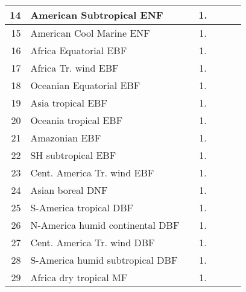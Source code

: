 {{\begin{tabular}{||r|l||c|c|c|c|c||}
 \hline
          14  & American Subtropical ENF                                     &       &  1.   &       &       \\
 \hline
          15  & American Cool Marine ENF                                     &       &  1.   &       &       \\
 \hline
 \hline
          16  & Africa Equatorial EBF                                        &       &  1.   &       &       \\
 \hline
          17  & Africa Tr. wind EBF                                          &       &  1.   &       &       \\
 \hline
          18  & Oceanian Equatorial EBF                                      &       &  1.   &       &       \\
 \hline
          19  & Asia tropical EBF                                            &       &  1.   &       &       \\
 \hline
          20  & Oceania tropical EBF                                         &       &  1.   &       &       \\
 \hline
          21  & Amazonian EBF                                                &       &  1.   &       &       \\
 \hline
          22  & SH subtropical EBF                                           &       &  1.   &       &       \\
 \hline
          23  & Cent. America Tr. wind EBF                                   &       &  1.   &       &       \\
 \hline
 \hline
          24  & Asian boreal DNF                                             &       &  1.   &       &       \\
 \hline
 \hline
          25  & S-America tropical DBF                                       &       &  1.   &       &       \\
 \hline
          26  & N-America humid continental DBF                              &       &  1.   &       &       \\
 \hline
          27  & Cent. America Tr. wind DBF                                   &       &  1.   &       &       \\
 \hline
          28  & S-America humid subtropical DBF                              &       &  1.   &       &       \\
 \hline
 \hline
          29  & Africa dry tropical MF                                       &       &  1.   &       &       \\
 \hline

\end{tabular}}}
